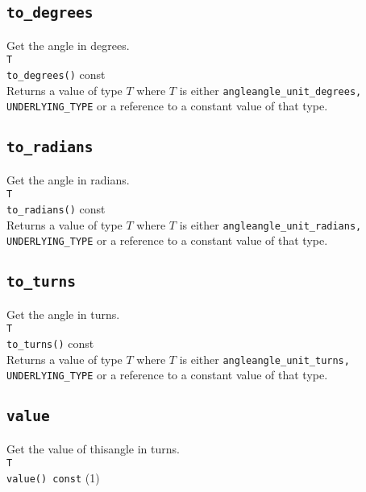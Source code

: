 \documentclass[oneside]{book}
\begin{document}
\subsection{\texttt{to\_degrees}}
Get the angle in degrees.\\

\noindent\texttt{T}\\
\texttt{to\_degrees}\texttt{()} const\\

\noindent{}Returns a value of type $T$ where $T$ is either
\texttt{angle\textlangle angle\_unit\_degrees, UNDERLYING\_TYPE\textrangle}
or a reference to a constant value of that type.

\subsection{\texttt{to\_radians}}
Get the angle in radians.\\

\noindent\texttt{T}\\
\texttt{to\_radians}\texttt{()} const\\

\noindent{}Returns a value of type $T$ where $T$ is either
\texttt{angle\textlangle angle\_unit\_radians, UNDERLYING\_TYPE\textrangle}
or a reference to a constant value of that type.

\subsection{\texttt{to\_turns}}
Get the angle in turns.\\

\noindent\texttt{T}\\
\texttt{to\_turns}\texttt{()} const\\

\noindent{}Returns a value of type $T$ where $T$ is either
\texttt{angle\textlangle angle\_unit\_turns, UNDERLYING\_TYPE\textrangle}
or a reference to a constant value of that type.

\subsection{\texttt{value}}
Get the value of thisangle in turns.\\

\noindent\texttt{T}\\
\texttt{value() const} (1)\\
\end{document}
